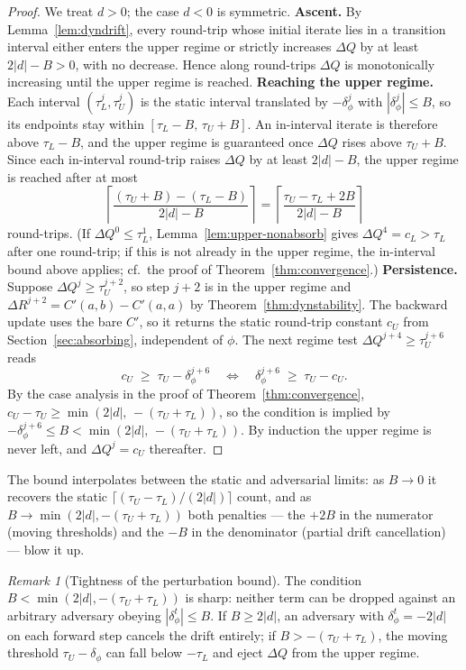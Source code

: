 \documentclass[letterpaper]{article} %
\theoremstyle{definition}
\theoremstyle{remark}
\newtheorem{remark}[theorem]{Remark}
\begin{document}
\begin{proof}
We treat $d>0$; the case $d<0$ is symmetric.
\textbf{Ascent.}  By Lemma~\ref{lem:dyndrift}, every round-trip whose initial iterate lies in a transition interval either enters the upper regime or strictly increases $\Delta Q$ by at least $2|d|-B>0$, with no decrease.  Hence along round-trips $\Delta Q$ is monotonically increasing until the upper regime is reached.
\textbf{Reaching the upper regime.}  Each interval $(\tau_L^j,\tau_U^j)$ is the static interval translated by $-\delta^j_\phi$ with $|\delta^j_\phi|\leq B$, so its endpoints stay within $[\tau_L-B,\,\tau_U+B]$.  An in-interval iterate is therefore above $\tau_L-B$, and the upper regime is guaranteed once $\Delta Q$ rises above $\tau_U+B$.  Since each in-interval round-trip raises $\Delta Q$ by at least $2|d|-B$, the upper regime is reached after at most
\[
    \left\lceil \frac{(\tau_U+B)-(\tau_L-B)}{2|d|-B} \right\rceil
    = \left\lceil \frac{\tau_U-\tau_L+2B}{2|d|-B} \right\rceil
\]
round-trips.  (If $\Delta Q^0 \leq \tau_L^1$, Lemma~\ref{lem:upper-nonabsorb} gives $\Delta Q^4 = c_L > \tau_L$ after one round-trip; if this is not already in the upper regime, the in-interval bound above applies; cf.\ the proof of Theorem~\ref{thm:convergence}.)
\textbf{Persistence.}  Suppose $\Delta Q^j \geq \tau_U^{j+2}$, so step $j+2$ is in the upper regime and $\Delta R^{j+2} = C'(a,b)-C'(a,a)$ by Theorem~\ref{thm:dynstability}.  The backward update uses the bare $C'$, so it returns the static round-trip constant $c_U$ from Section~\ref{sec:absorbing}, independent of $\phi$.  The next regime test $\Delta Q^{j+4} \geq \tau_U^{j+6}$ reads
\[
    c_U \;\geq\; \tau_U - \delta^{j+6}_\phi
    \quad\Longleftrightarrow\quad
    \delta^{j+6}_\phi \;\geq\; \tau_U - c_U .
\]
By the case analysis in the proof of Theorem~\ref{thm:convergence}, $c_U - \tau_U \geq \min(2|d|,\,-(\tau_U+\tau_L))$, so the condition is implied by $-\delta^{j+6}_\phi \leq B < \min(2|d|,\,-(\tau_U+\tau_L))$.  By induction the upper regime is never left, and $\Delta Q^j = c_U$ thereafter. \qedhere
\end{proof}
The bound interpolates between the static and adversarial limits: as $B \to 0$ it recovers the static $\lceil(\tau_U - \tau_L)/(2|d|)\rceil$ count, and as $B \to \min(2|d|, -(\tau_U+\tau_L))$ both penalties --- the $+2B$ in the numerator (moving thresholds) and the $-B$ in the denominator (partial drift cancellation) --- blow it up.
\begin{remark}[Tightness of the perturbation bound]\label{rem:tight}
The condition $B < \min(2|d|,-(\tau_U+\tau_L))$ is sharp: neither term can be dropped against an arbitrary adversary obeying $|\delta^t_\phi| \leq B$.  If $B \geq 2|d|$, an adversary with $\delta^t_\phi = -2|d|$ on each forward step cancels the drift entirely; if $B > -(\tau_U+\tau_L)$, the moving threshold $\tau_U - \delta_\phi$ can fall below $-\tau_L$ and eject $\Delta Q$ from the upper regime.
\end{remark}
\end{document}

